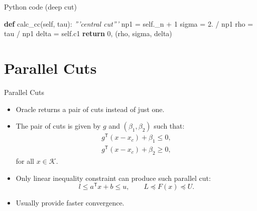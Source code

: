 \documentclass[
  ignorenonframetext,
  aspectratio=169,
  serif,onlymath]{beamer}
\newenvironment{Shaded}{}{}
\newcommand{\CommentTok}[1]{\textcolor[rgb]{0.38,0.63,0.69}{\textit{#1}}}
\newcommand{\ControlFlowTok}[1]{\textcolor[rgb]{0.00,0.44,0.13}{\textbf{#1}}}
\newcommand{\DecValTok}[1]{\textcolor[rgb]{0.25,0.63,0.44}{#1}}
\newcommand{\FloatTok}[1]{\textcolor[rgb]{0.25,0.63,0.44}{#1}}
\newcommand{\KeywordTok}[1]{\textcolor[rgb]{0.00,0.44,0.13}{\textbf{#1}}}
\newcommand{\NormalTok}[1]{#1}
\newcommand{\OperatorTok}[1]{\textcolor[rgb]{0.40,0.40,0.40}{#1}}
\newcommand{\VariableTok}[1]{\textcolor[rgb]{0.10,0.09,0.49}{#1}}
\begin{document}
\begin{frame}[fragile]{Python code (deep cut)}
\protect\hypertarget{python-code-deep-cut-1}{}

\begin{Shaded}
\begin{Highlighting}[]
\KeywordTok{def}\NormalTok{ calc_cc(}\VariableTok{self}\NormalTok{, tau):}
    \CommentTok{'''central cut'''}
\NormalTok{    np1 }\OperatorTok{=} \VariableTok{self}\NormalTok{._n }\OperatorTok{+} \DecValTok{1}
\NormalTok{    sigma }\OperatorTok{=} \FloatTok{2.} \OperatorTok{/}\NormalTok{ np1}
\NormalTok{    rho }\OperatorTok{=}\NormalTok{ tau }\OperatorTok{/}\NormalTok{ np1}
\NormalTok{    delta }\OperatorTok{=} \VariableTok{self}\NormalTok{.c1}
    \ControlFlowTok{return} \DecValTok{0}\NormalTok{, (rho, sigma, delta)}
\end{Highlighting}
\end{Shaded}

\end{frame}

\hypertarget{parallel-cuts}{%
\section{Parallel Cuts}\label{parallel-cuts}}

\begin{frame}{Parallel Cuts}
\protect\hypertarget{parallel-cuts-1}{}

\begin{itemize}
\item
  Oracle returns a pair of cuts instead of just one.
\item
  The pair of cuts is given by \(g\) and \((\beta_1, \beta_2)\) such
  that: \[\begin{array}{l}
  g^\mathsf{T} (x - x_c) + \beta_1 \leq 0,  \\
  g^\mathsf{T} (x - x_c) + \beta_2 \geq 0,
  \end{array}\] for all \(x \in \mathcal{K}\).
\item
  Only linear inequality constraint can produce such parallel cut:
  \[ l \leq a^\mathsf{T} x + b \leq u, \qquad L \preceq F(x) \preceq U. \]
\item
  Usually provide faster convergence.
\end{itemize}

\end{frame}
\end{document}
